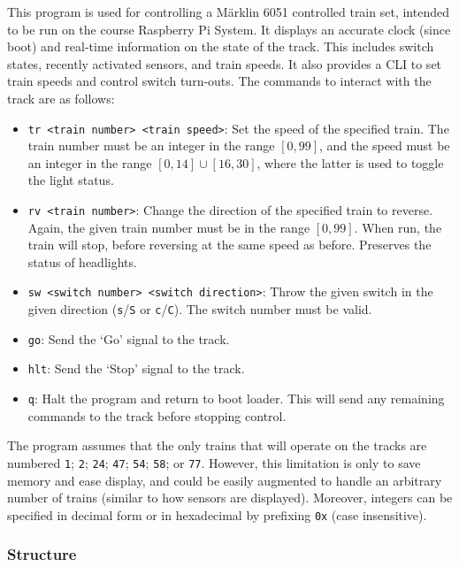 \documentclass[12pt, titlepage]{article}
\begin{document}
    This program is used for controlling a Märklin 6051 controlled train set, intended to be run on the course Raspberry Pi System. It displays an accurate clock (since boot) and real-time information on the state of the track. This includes switch states, recently activated sensors, and train speeds. It also provides a CLI to set train speeds and control switch turn-outs. The commands to interact with the track are as follows:
    \begin{itemize}
        \item \verb`tr <train number> <train speed>`: Set the speed of the specified train. The train number must be an integer in the range $[0, 99]$, and the speed must be an integer in the range $[0,14] \cup [16,30]$, where the latter is used to toggle the light status.
        \item \verb`rv <train number>`: Change the direction of the specified train to reverse. Again, the given train number must be in the range $[0,99]$. When run, the train will stop, before reversing at the same speed as before. Preserves the status of headlights.
        \item \verb`sw <switch number> <switch direction>`: Throw the given switch in the given direction (\verb`s`/\verb`S` or \verb`c`/\verb`C`). The switch number must be valid.
        \item \verb`go`: Send the `Go' signal to the track.
        \item \verb`hlt`: Send the `Stop' signal to the track.
        \item \verb`q`: Halt the program and return to boot loader. This will send any remaining commands to the track before stopping control.
    \end{itemize}
    The program assumes that the only trains that will operate on the tracks are numbered \verb`1`; \verb`2`; \verb`24`; \verb`47`; \verb`54`; \verb`58`; or \verb`77`. However, this limitation is only to save memory and ease display, and could be easily augmented to handle an arbitrary number of trains (similar to how sensors are displayed). Moreover, integers can be specified in decimal form or in hexadecimal by prefixing \verb`0x` (case insensitive).
    
    \subsubsection{Structure}
    \label{sec:k4-structure}
    
\end{document}
